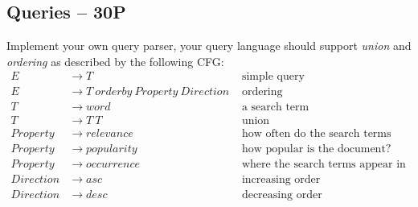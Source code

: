 \documentclass[11pt]{article}
\begin{document}
\subsection{Queries -- 30P} 
\label{sec:queries}
Implement your own query parser, your query language should support \emph{union} and \emph{ordering} as described by the following CFG:
\begin{align*}
E &\to T &\mbox{ simple query}\\
E &\to T \ orderby \ Property \ Direction &\mbox{ ordering}\\
T &\to word &\mbox{ a search term} \\
T &\to T \ T &\mbox{ union} \\
Property &\to relevance &\mbox{ how often do the search terms appear in a document?}\\
Property &\to popularity &\mbox{ how popular is the document?}\\
Property &\to occurrence &\mbox{ where the search terms appear in a document?}\\
Direction &\to asc &\mbox{ increasing order}\\
Direction &\to desc &\mbox{ decreasing order}
\end{align*}
\end{document}
